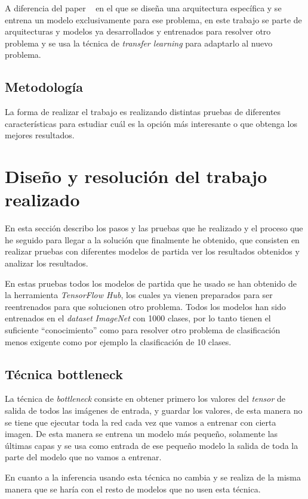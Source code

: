 \documentclass[12pt,a4paper]{article}
\begin{document}
A diferencia del paper ~\cite{DBLP:journals/corr/abs-1708-01141} en el que se diseña una arquitectura específica y se entrena un modelo exclusivamente para ese problema, en este trabajo se parte de arquitecturas y modelos ya desarrollados y entrenados para resolver otro problema y se usa la técnica de \textit{transfer learning} para adaptarlo al nuevo problema.

\subsection{Metodología}
La forma de realizar el trabajo es realizando distintas pruebas de diferentes características para estudiar cuál es la opción más interesante o que obtenga los mejores resultados.

\newpage
\section{Diseño y resolución del trabajo realizado}
En esta sección describo los pasos y las pruebas que he realizado y el proceso que he seguido para llegar a la solución que finalmente he obtenido, que consisten en realizar pruebas con diferentes modelos de partida ver los resultados obtenidos y analizar los resultados.
\bigskip

En estas pruebas todos los modelos de partida que he usado se han obtenido de la herramienta \textit{TensorFlow Hub}, los cuales ya vienen preparados para ser reentrenados para que solucionen otro problema. Todos los modelos han sido entrenados en el \textit{dataset} \textit{ImageNet} con 1000 clases, por lo tanto tienen el suficiente ``conocimiento'' como para resolver otro problema de clasificación menos exigente como por ejemplo la clasificación de 10 clases.

\subsection{Técnica bottleneck}
La técnica de \textit{bottleneck} consiste en obtener primero los valores del \textit{tensor} de salida de todos las imágenes de entrada, y guardar los valores, de esta manera no se tiene que ejecutar toda la red cada vez que vamos a entrenar con cierta imagen. De esta manera se entrena un modelo más pequeño, solamente las últimas capas y se usa como entrada de ese pequeño modelo la salida de toda la parte del modelo que no vamos a entrenar.
\bigskip

En cuanto a la inferencia usando esta técnica no cambia y se realiza de la misma manera que se haría con el resto de modelos que no usen esta técnica.
\end{document}
